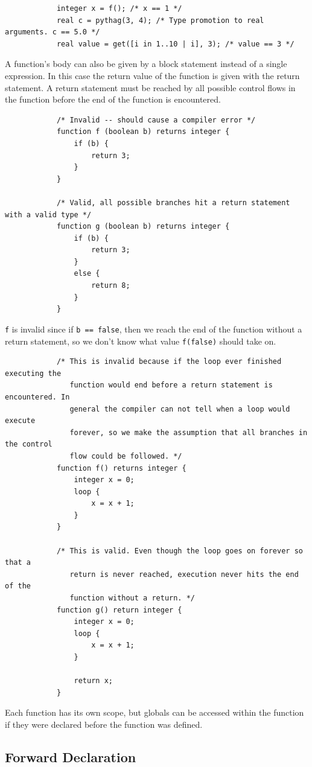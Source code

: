 \documentclass{article}
\begin{document}
		\begin{lstlisting}
			integer x = f(); /* x == 1 */
			real c = pythag(3, 4); /* Type promotion to real arguments. c == 5.0 */
			real value = get([i in 1..10 | i], 3); /* value == 3 */
		\end{lstlisting}

		A function's body can also be given by a block statement instead of a single expression. In this case the return
		value of the function is given with the return statement. A return statement must be reached by all possible
		control flows in the function before the end of the function is encountered.

		\begin{lstlisting}
			/* Invalid -- should cause a compiler error */
			function f (boolean b) returns integer {
				if (b) {
					return 3;
				}
			}

			/* Valid, all possible branches hit a return statement with a valid type */
			function g (boolean b) returns integer {
				if (b) {
					return 3;
				}
				else {
					return 8;
				}
			}
		\end{lstlisting}

		\texttt{f} is invalid since if \texttt{b == false}, then we reach the end of the function without a return
		statement, so we don't know what value \texttt{f(false)} should take on.

		\begin{lstlisting}
			/* This is invalid because if the loop ever finished executing the
			   function would end before a return statement is encountered. In
			   general the compiler can not tell when a loop would execute
			   forever, so we make the assumption that all branches in the control
			   flow could be followed. */
			function f() returns integer {
				integer x = 0;
				loop {
					x = x + 1;
				}
			}

			/* This is valid. Even though the loop goes on forever so that a
			   return is never reached, execution never hits the end of the
			   function without a return. */
			function g() return integer {
				integer x = 0;
				loop {
					x = x + 1;
				}

				return x;
			}
		\end{lstlisting}

		Each function has its own scope, but globals can be accessed within the function if they were declared before
		the function was defined.

	\subsection{Forward Declaration}
\end{document}
